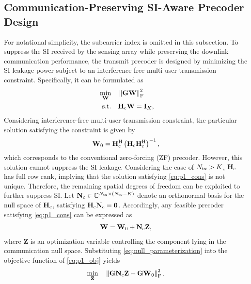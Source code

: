 \documentclass[conference]{IEEEtran}
\begin{document}
\subsection{Communication-Preserving SI-Aware Precoder Design}\label{sec:precoder}
For notational simplicity, the subcarrier index is omitted in this subsection.  To suppress the SI received by the sensing array while preserving the downlink communication performance, the transmit precoder is designed by minimizing the SI leakage power subject to an interference-free multi-user transmission constraint. Specifically, it can be formulated as
\begin{subequations}
\begin{align}\
\min_{\mathbf{W}} \quad
& \left\| \mathbf{G}\mathbf{W} \right\|_{\mathrm{F}}^{2}
\label{eq:p1_obj}\\
\mathrm{s.t.}\quad
& \mathbf{H}_{\rm c}\mathbf{W}
= \mathbf{I}_{K},
\label{eq:p1_cons}
\end{align}    
\end{subequations}
Considering interference-free multi-user transmission constraint, the particular solution satisfying the constraint  is given by
\begin{align}
\mathbf{W}_{0} = \mathbf{H}_{\rm c}^{\rm H}
\left( \mathbf{H}_{\rm c}\mathbf{H}_{\rm c}^{\rm H} \right)^{-1},
\label{eq:zf}
\end{align}
which corresponds to the conventional zero-forcing (ZF) precoder. However, this solution cannot suppress the SI leakage. Considering the case of $N_{\rm tx}>K$, $\mathbf{H}_{\rm c}$ has full row rank, implying that the solution satisfying \eqref{eq:p1_cons} is not unique. Therefore, the remaining spatial degrees of freedom can be exploited to further suppress SI. Let
$\mathbf{N}_{\rm c}\in
\mathbb{C}^{N_{\rm tx}\times(N_{\rm tx}-K)}$
denote an orthonormal basis for the null space of $\mathbf{H}_{\rm c}$, satisfying
$\mathbf{H}_{\rm c}\mathbf{N}_{\rm c}
=\mathbf{0}$.
Accordingly, any feasible precoder satisfying \eqref{eq:p1_cons} can be expressed as
\begin{align}
\mathbf{W} = \mathbf{W}_{0} + \mathbf{N}_{\rm c}\mathbf{Z},
\label{eq:null_parameterization}
\end{align}
where $\mathbf{Z}$ is an optimization variable controlling the component lying in the communication null space. Substituting \eqref{eq:null_parameterization} into the objective function of \eqref{eq:p1_obj} yields
\begin{align}
\min_{\mathbf{Z}}
\quad
\left\|
\mathbf{G}\mathbf{N}_{\rm c}\mathbf{Z}
+
\mathbf{G}\mathbf{W}_{0}
\right\|_{\mathrm{F}}^{2}.
\label{eq:null_ls}
\end{align}
\end{document}

